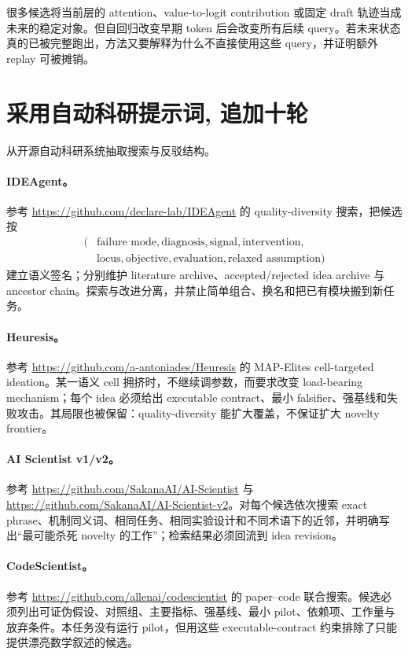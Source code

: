 \documentclass[UTF8,zihao=-4,a4paper]{ctexart}
\begin{document}
很多候选将当前层的 attention、value-to-logit contribution 或固定 draft 轨迹当成未来的稳定对象。但自回归改变早期 token 后会改变所有后续 query。若未来状态真的已被完整跑出，方法又要解释为什么不直接使用这些 query，并证明额外 replay 可被摊销。

\section{采用自动科研提示词, 追加十轮}

从开源自动科研系统抽取搜索与反驳结构。

\paragraph{IDEAgent。}
参考 \url{https://github.com/declare-lab/IDEAgent} 的 quality-diversity 搜索，把候选按
\[
\begin{aligned}
(&\text{failure mode},\text{diagnosis},\text{signal},\text{intervention},\\
 &\text{locus},\text{objective},\text{evaluation},\text{relaxed assumption})
\end{aligned}
\]
建立语义签名；分别维护 literature archive、accepted/rejected idea archive 与 ancestor chain。探索与改进分离，并禁止简单组合、换名和把已有模块搬到新任务。

\paragraph{Heuresis。}
参考 \url{https://github.com/a-antoniades/Heuresis} 的 MAP-Elites cell-targeted ideation。某一语义 cell 拥挤时，不继续调参数，而要求改变 load-bearing mechanism；每个 idea 必须给出 executable contract、最小 falsifier、强基线和失败攻击。其局限也被保留：quality-diversity 能扩大覆盖，不保证扩大 novelty frontier。

\paragraph{AI Scientist v1/v2。}
参考 \url{https://github.com/SakanaAI/AI-Scientist} 与 \url{https://github.com/SakanaAI/AI-Scientist-v2}。对每个候选依次搜索 exact phrase、机制同义词、相同任务、相同实验设计和不同术语下的近邻，并明确写出“最可能杀死 novelty 的工作”；检索结果必须回流到 idea revision。

\paragraph{CodeScientist。}
参考 \url{https://github.com/allenai/codescientist} 的 paper--code 联合搜索。候选必须列出可证伪假设、对照组、主要指标、强基线、最小 pilot、依赖项、工作量与放弃条件。本任务没有运行 pilot，但用这些 executable-contract 约束排除了只能提供漂亮数学叙述的候选。
\end{document}
